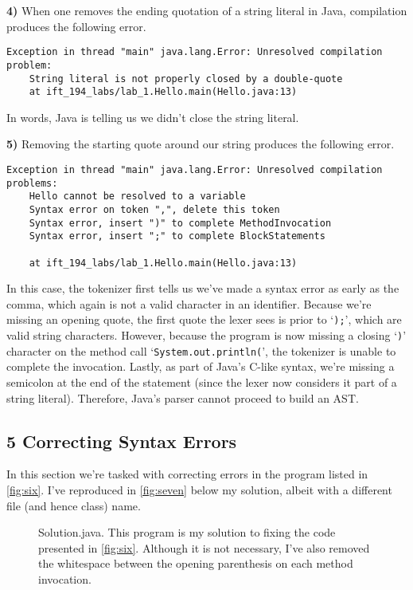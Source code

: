 \documentclass[leqno, 11pt]{article}
\begin{document}
\textbf{4)} When one removes the ending quotation of a string literal in Java, compilation produces the following error.
\begin{verbatim}
Exception in thread "main" java.lang.Error: Unresolved compilation problem:
    String literal is not properly closed by a double-quote
    at ift_194_labs/lab_1.Hello.main(Hello.java:13)
\end{verbatim}
In words, Java is telling us we didn't close the string literal.

\textbf{5)} Removing the starting quote around our string produces the following error.
\begin{verbatim}
Exception in thread "main" java.lang.Error: Unresolved compilation problems: 
    Hello cannot be resolved to a variable
    Syntax error on token ",", delete this token
    Syntax error, insert ")" to complete MethodInvocation
    Syntax error, insert ";" to complete BlockStatements

    at ift_194_labs/lab_1.Hello.main(Hello.java:13)
\end{verbatim}
In this case, the tokenizer first tells us we've made a syntax error as early as the comma, which again is not a valid character in an identifier. Because we're missing an opening quote, the first quote the lexer sees is prior to `\texttt{);}', which are valid string characters. However, because the program is now missing a closing `\texttt{)}' character on the method call `\texttt{System.out.println(}', the tokenizer is unable to complete the invocation. Lastly, as part of Java's C-like syntax, we're missing a semicolon at the end of the statement (since the lexer now considers it part of a string literal). Therefore, Java's parser cannot proceed to build an AST.
\subsection*{5 Correcting Syntax Errors}
In this section we're tasked with correcting errors in the program listed in \autoref{fig:six}. I've reproduced in \autoref{fig:seven} below my solution, albeit with a different file (and hence class) name.
\begin{figure}[ht!]
  \centering
  
  \caption{Solution.java. This program is my solution to fixing the code presented in \autoref{fig:six}. Although it is not necessary, I've also removed the whitespace between the opening parenthesis on each method invocation.}
  \label{fig:seven}
\end{figure}
\end{document}
